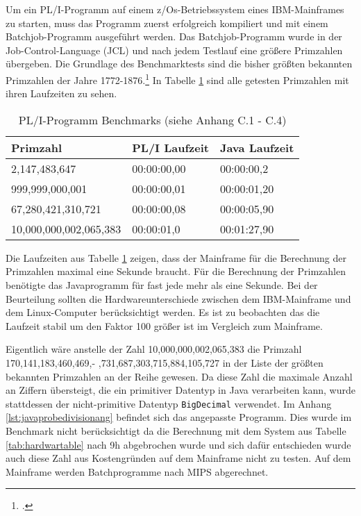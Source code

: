 Um ein PL/I-Programm auf einem z/Os-Betriebssystem eines IBM-Mainframes zu starten, muss das Programm zuerst erfolgreich kompiliert und mit einem Batchjob-Programm ausgeführt werden. Das Batchjob-Programm wurde in der Job-Control-Language (JCL) und nach jedem Testlauf eine größere Primzahlen übergeben.
Die Grundlage des Benchmarktests sind die bisher größten bekannten Primzahlen der Jahre 1772-1876.\footcite[Vgl. ][]{prime} In Tabelle \ref{tab:plibenchmark} sind alle getesten Primzahlen mit ihren Laufzeiten zu sehen. 

\begin{table}[h]
	\centering
	\begin{tabularx}{\textwidth}{|X|X|X|}
		\hline
		\textbf{Primzahl} & \textbf{PL/I Laufzeit} & \textbf{Java Laufzeit} \\
		\hline
		2,147,483,647 & 00:00:00,00 & 00:00:00,2 \\
		
		999,999,000,001 & 00:00:00,01 & 00:00:01,20\\
		
		67,280,421,310,721 & 00:00:00,08 & 00:00:05,90 \\
		
		10,000,000,002,065,383 & 00:00:01,0 & 00:01:27,90 \\
		\hline
	\end{tabularx}
	\caption{PL/I-Programm Benchmarks (siehe Anhang C.1 - C.4) \label{tab:plibenchmark}}
\end{table}


Die Laufzeiten aus Tabelle \ref{tab:plibenchmark} zeigen, dass der Mainframe für die Berechnung der Primzahlen maximal eine Sekunde braucht. Für die Berechnung der Primzahlen benötigte das Javaprogramm für fast jede mehr als eine Sekunde. Bei der Beurteilung sollten die Hardwareunterschiede zwischen dem IBM-Mainframe und dem Linux-Computer berücksichtigt werden. Es ist zu beobachten das die Laufzeit stabil um den Faktor 100 größer ist im Vergleich zum Mainframe.

Eigentlich wäre anstelle der Zahl 10,000,000,002,065,383 die Primzahl 170,141,183,460,469,- ,731,687,303,715,884,105,727 in der Liste der größten bekannten Primzahlen an der Reihe gewesen. 
Da diese Zahl die maximale Anzahl an Ziffern übersteigt, die ein primitiver Datentyp in Java verarbeiten kann, wurde stattdessen der nicht-primitive Datentyp \verb+BigDecimal+ verwendet. Im Anhang \ref{lst:javaprobedivisionang} befindet sich das angepasste Programm. 
Dies wurde im Benchmark nicht berücksichtigt da die Berechnung mit dem System aus Tabelle \ref{tab:hardwartable} nach 9h abgebrochen wurde und sich dafür entschieden wurde auch diese Zahl aus Kostengründen auf dem Mainframe nicht zu testen. Auf dem Mainframe werden Batchprogramme nach \ac{MIPS} abgerechnet.

